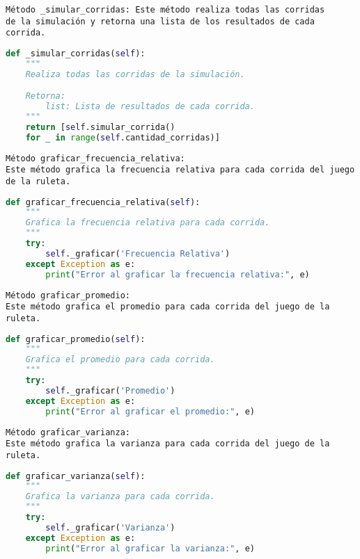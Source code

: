 \documentclass{article}
\begin{document}
\begin{itemize}
\begin{verbatim}
Método _simular_corridas: Este método realiza todas las corridas
de la simulación y retorna una lista de los resultados de cada corrida.
\end{verbatim}

\begin{lstlisting}[language=Python]
def _simular_corridas(self):
    """
    Realiza todas las corridas de la simulación.

    Retorna:
        list: Lista de resultados de cada corrida.
    """
    return [self.simular_corrida()
    for _ in range(self.cantidad_corridas)]
\end{lstlisting}
\clearpage

\begin{verbatim}
Método graficar_frecuencia_relativa:
Este método grafica la frecuencia relativa para cada corrida del juego de la ruleta.
\end{verbatim}

\begin{lstlisting}[language=Python]
def graficar_frecuencia_relativa(self):
    """
    Grafica la frecuencia relativa para cada corrida.
    """
    try:
        self._graficar('Frecuencia Relativa')
    except Exception as e:
        print("Error al graficar la frecuencia relativa:", e)
\end{lstlisting}

\begin{verbatim}
Método graficar_promedio:
Este método grafica el promedio para cada corrida del juego de la ruleta.
\end{verbatim}

\begin{lstlisting}[language=Python]
def graficar_promedio(self):
    """
    Grafica el promedio para cada corrida.
    """
    try:
        self._graficar('Promedio')
    except Exception as e:
        print("Error al graficar el promedio:", e)
\end{lstlisting}

\begin{verbatim}
Método graficar_varianza:
Este método grafica la varianza para cada corrida del juego de la ruleta.
\end{verbatim}

\begin{lstlisting}[language=Python]
def graficar_varianza(self):
    """
    Grafica la varianza para cada corrida.
    """
    try:
        self._graficar('Varianza')
    except Exception as e:
        print("Error al graficar la varianza:", e)
\end{lstlisting}
\clearpage


\end{itemize}
\end{document}
